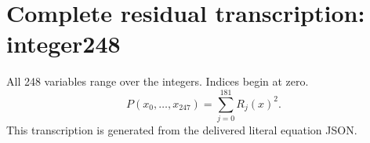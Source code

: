 \documentclass[10pt]{article}
\begin{document}
\section*{Complete residual transcription: integer248}
All 248 variables range over the integers. Indices begin at zero.
\[P(x_0,\ldots,x_{247})=\sum_{j=0}^{181}R_j(x)^2.\]
This transcription is generated from the delivered literal equation JSON.

\end{document}
